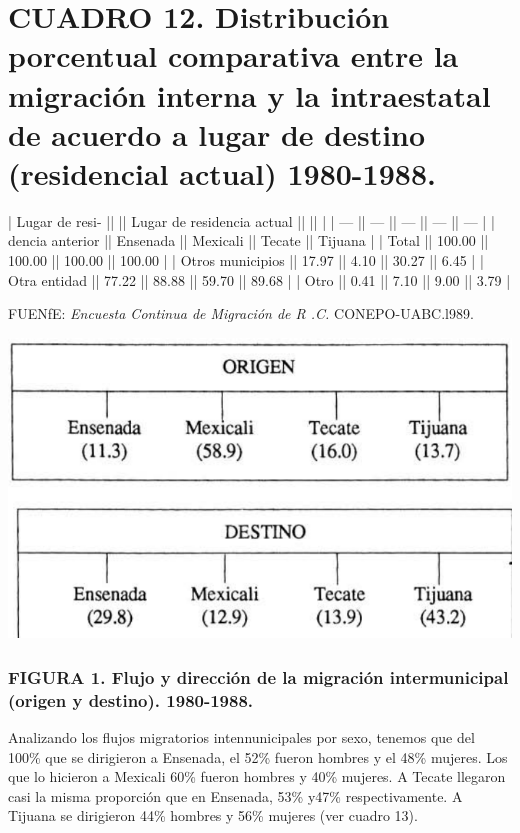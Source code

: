 \documentclass{article}
\begin{document}
\section{CUADRO 12. Distribución porcentual comparativa entre la migración interna y la intraestatal de acuerdo a lugar de destino (residencial actual) 1980-1988.}

| Lugar de resi-   ||          || Lugar de residencia actual ||        ||         |
| ---              || ---      || ---                        || ---    || ---     |
| dencia anterior  || Ensenada || Mexicali                   || Tecate || Tijuana |
| Total            || 100.00   || 100.00                     || 100.00 || 100.00  |
| Otros municipios || 17.97    || 4.10                       || 30.27  || 6.45    |
| Otra entidad     || 77.22    || 88.88                      || 59.70  || 89.68   |
| Otro             || 0.41     || 7.10                       || 9.00   || 3.79    |

FUENfE: \textit{Encuesta Continua de Migración de R .C.} CONEPO-UABC.l989.


\includegraphics{_page_29_Figure_1.png}


\subsubsection{FIGURA 1. Flujo y dirección de la migración intermunicipal (origen y destino). 1980-1988.}

Analizando los flujos migratorios intennunicipales por sexo, tenemos que del 100\% que se dirigieron a Ensenada, el 52\% fueron hombres y el 48\% mujeres. Los que lo hicieron a Mexicali 60\% fueron hombres y 40\% mujeres. A Tecate llegaron casi la misma proporción que en Ensenada, 53\% y47\% respectivamente. A Tijuana se dirigieron 44\% hombres y 56\% mujeres (ver cuadro 13).
\end{document}
